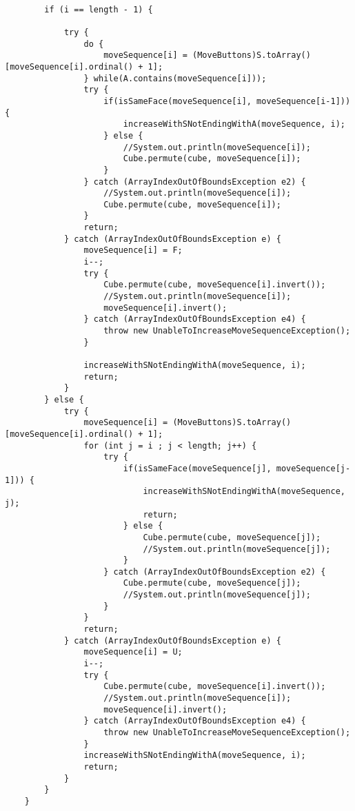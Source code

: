 \begin{verbatim}

		if (i == length - 1) {

			try {
				do {
					moveSequence[i] = (MoveButtons)S.toArray()[moveSequence[i].ordinal() + 1];
				} while(A.contains(moveSequence[i]));
				try {
					if(isSameFace(moveSequence[i], moveSequence[i-1])) {
						increaseWithSNotEndingWithA(moveSequence, i);
					} else {
						//System.out.println(moveSequence[i]);
						Cube.permute(cube, moveSequence[i]);
					}
				} catch (ArrayIndexOutOfBoundsException e2) {
					//System.out.println(moveSequence[i]);
					Cube.permute(cube, moveSequence[i]);
				}
				return;
			} catch (ArrayIndexOutOfBoundsException e) {
				moveSequence[i] = F;
				i--;
				try {
					Cube.permute(cube, moveSequence[i].invert());
					//System.out.println(moveSequence[i]);
					moveSequence[i].invert();
				} catch (ArrayIndexOutOfBoundsException e4) {
					throw new UnableToIncreaseMoveSequenceException();
				}

				increaseWithSNotEndingWithA(moveSequence, i);
				return;
			}
		} else {
			try {
				moveSequence[i] = (MoveButtons)S.toArray()[moveSequence[i].ordinal() + 1];
				for (int j = i ; j < length; j++) {
					try {
						if(isSameFace(moveSequence[j], moveSequence[j-1])) {
							increaseWithSNotEndingWithA(moveSequence, j);
							return;
						} else {
							Cube.permute(cube, moveSequence[j]);
							//System.out.println(moveSequence[j]);
						}
					} catch (ArrayIndexOutOfBoundsException e2) {
						Cube.permute(cube, moveSequence[j]);
						//System.out.println(moveSequence[j]);
					}
				}
				return; 
			} catch (ArrayIndexOutOfBoundsException e) {
				moveSequence[i] = U;
				i--;
				try {
					Cube.permute(cube, moveSequence[i].invert());
					//System.out.println(moveSequence[i]);
					moveSequence[i].invert();
				} catch (ArrayIndexOutOfBoundsException e4) {
					throw new UnableToIncreaseMoveSequenceException();
				}
				increaseWithSNotEndingWithA(moveSequence, i);
				return;
			}
		}
	}
	
\end{verbatim}